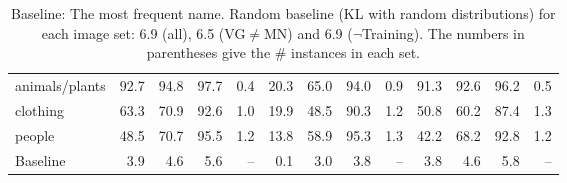 \begin{table}
\begin{tabular}{l@{~}|@{~}r@{~}r@{~}rr@{~}|@{~}r@{~}r@{~}rr@{~}|@{~}r@{~}r@{~}rr}
		animals/plants &               92.7 &                 94.8 &                   97.7 &            0.4 &            20.3 &              65.0 &                94.0 &         0.9 &             91.3 &               92.6 &                 96.2 &          0.5 \\
		clothing       &               63.3 &                 70.9 &                   92.6 &            1.0 &            19.9 &              48.5 &                90.3 &         1.2 &             50.8 &               60.2 &                 87.4 &          1.3 \\
		people         &               48.5 &                 70.7 &                   95.5 &            1.2 &            13.8 &              58.9 &                95.3 &         1.3 &             42.2 &               68.2 &                 92.8 &          1.2 \\
		\bottomrule
		Baseline       &                3.9 &                  4.6 &                    5.6 &            -- &             0.1 &               3.0 &                 3.8 &         -- &              3.8 &                4.6 &                  5.8 &          -- \\
	\end{tabular}
	\caption{Baseline: The most frequent name. Random baseline (KL with random distributions) for each image set: 6.9 (all), 6.5 (VG$\neq$MN) and 6.9 ($\neg$Training). The numbers in parentheses give the \# instances in each set.	\label{tab:model}}
\end{table}
